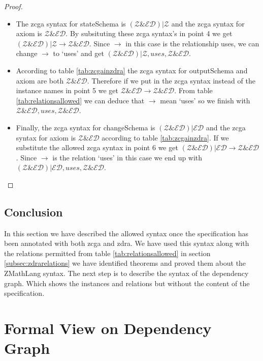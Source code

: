 \begin{proof}
\begin{itemize}
\item The \gls{zcga} syntax for stateSchema is $(\mathcal{Z} \& \mathcal{ED}) | \mathcal{Z}$ and the \gls{zcga} syntax for axiom is  $\mathcal{Z} \& \mathcal{ED}$. By subsituting these \gls{zcga} syntax's in point 4 we get $(\mathcal{Z} \& \mathcal{ED}) | \mathcal{Z} \longrightarrow \mathcal{Z} \& \mathcal{ED}$. Since $\longrightarrow$ in this case is the relationship uses, we can change $\longrightarrow$ to `uses' and get $(\mathcal{Z} \& \mathcal{ED}) | \mathcal{Z}, uses, \mathcal{Z} \& \mathcal{ED}$.

\item According to table \ref{tab:zcgainzdra} the \gls{zcga} syntax for outputSchema and axiom are both $\mathcal{Z} \& \mathcal{ED}$. Therefore if we put in the \gls{zcga} syntax instead of the instance names in point 5 we get $\mathcal{Z} \& \mathcal{ED} \longrightarrow \mathcal{Z} \& \mathcal{ED}$. From table \ref{tab:relationsallowed} we can deduce that $\longrightarrow$ mean `uses' so we finish with $\mathcal{Z} \& \mathcal{ED}, uses, \mathcal{Z} \& \mathcal{ED}$.

\item Finally, the \gls{zcga} syntax for changeSchema is $(\mathcal{Z} \& \mathcal{ED}) | \mathcal{ED}$ and the \gls{zcga} syntax for axiom is $\mathcal{Z} \& \mathcal{ED}$ according to table \ref{tab:zcgainzdra}. If we substitute the allowed \gls{zcga} syntax in point 6 we get $(\mathcal{Z} \& \mathcal{ED}) | \mathcal{ED} \longrightarrow \mathcal{Z} \& \mathcal{ED}$. Since $\longrightarrow$ is the relation `uses' in this case we end up with $(\mathcal{Z} \& \mathcal{ED}) | \mathcal{ED}, uses, \mathcal{Z} \& \mathcal{ED}$.
\end{itemize}
\end{proof}

\subsection{Conclusion}
In this section we have described the allowed syntax once the specification has been annotated with both \gls{zcga} and \gls{zdra}. We have used this syntax along with the relations permitted from table \ref{tab:relationsallowed} in section \ref{subsec:zdrarelations} we have identified theorems and proved them about the ZMathLang syntax. The next step is to describe the syntax of the dependency graph. Which shows the instances and relations but without the content of the specification.

\section{Formal View on Dependency Graph}

